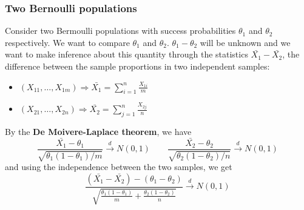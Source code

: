 \subsubsection{Two Bernoulli populations}
Consider two Bermoulli populations with success probabilities $\theta_1$ and $\theta_2$ respectively.
We want to compare $\theta_1$ and $\theta_2$. $\theta_1-\theta_2$ will be unknown and we want to make inference about this quantity through the statistics $\bar{X_1}-\bar{X_2}$, 
the difference between the sample proportions in two independent samples:
\begin{itemize}
    \item $(X_{11},\ldots,X_{1m})\Rightarrow\bar{X_1} = \sum_{i=1}^{n}\frac{X_{1i}}{m}$
    \item $(X_{21},\ldots,X_{2n})\Rightarrow\bar{X_2} = \sum_{j=1}^{n}\frac{X_{2j}}{n}$
\end{itemize}
By the \textbf{De Moivere-Laplace theorem}, we have
\begin{equation*}
    \frac{\bar{X_1}-\theta_1}{\sqrt{\theta_1(1-\theta_1)/m}}\xrightarrow{d}N(0,1) \qquad \frac{\bar{X_2}-\theta_2}{\sqrt{\theta_2(1-\theta_2)/n}}\xrightarrow{d}N(0,1)
\end{equation*}
and using the independence between the two samples, we get
\begin{equation*}
    \frac{(\bar{X_1}-\bar{X_2}) - (\theta_1 - \theta_2)}{\sqrt{\frac{\theta_1(1-\theta_1)}{m} + \frac{\theta_2(1-\theta_2)}{n}}}\xrightarrow{d} N(0,1)
\end{equation*}

